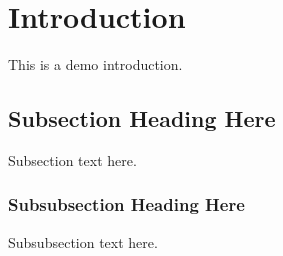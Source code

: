 \section{Introduction}


This is a demo introduction.

\subsection{Subsection Heading Here}
Subsection text here.


\subsubsection{Subsubsection Heading Here}
Subsubsection text here.